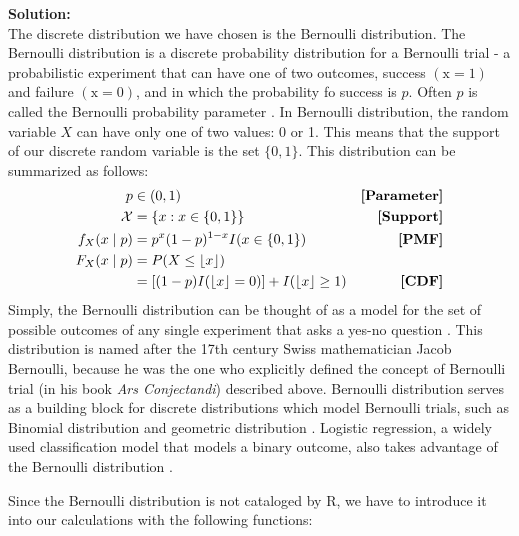 \documentclass{article}\usepackage[]{graphicx}\usepackage[]{color}
\begin{document}
\begin{enumerate}
\begin{enumerate}
\textbf{Solution:}\\ The discrete distribution we have chosen is the Bernoulli distribution. The Bernoulli distribution  is a discrete probability distribution for a Bernoulli trial - a probabilistic experiment that can have one of two outcomes, success $\mathrm{(x = 1)}$ and failure $\mathrm{(x = 0)}$, and in which the probability fo success is $p$. Often $p$  is called the Bernoulli probability parameter \citep{forbes_stat}. In Bernoulli distribution, the random variable $X$ can have only one of two values: 0 or 1. This means that the support of our discrete random variable is the set $\mathrm{\{0,1\}}$. This distribution can be summarized as follows:
\begin{align*}
  p               &\in (0,1)                                                                               &\text{\textbf{[Parameter]}}\\
  \mathcal{X}     & = \{x: x \in \{0,1\}\}                                                                   &\text{\textbf{[Support]}}\\
  f_{X}(x \mid p) & = p^{x} (1-p)^{1-x}I(x \in \{0,1\})                                                      &\text{\textbf{[PMF]}}\\
  F_{X}(x \mid p) & = P(X \leq \left\lfloor x \right\rfloor)\\
                  & = [(1-p)I(\left\lfloor x \right\rfloor = 0)] + I(\left\lfloor x \right\rfloor \geq 1)  &\text{\textbf{[CDF]}}\\
\end{align*}
Simply, the Bernoulli distribution can be thought of as a model for the set of possible outcomes of any single experiment that asks a yes-no question \citep{bernoulli_brilliant}. This distribution is named after the 17th century Swiss mathematician Jacob Bernoulli, because he was the one who explicitly defined the concept of Bernoulli trial (in his book \emph{Ars Conjectandi}) described above. Bernoulli distribution serves as a building block for discrete distributions which model Bernoulli trials, such as Binomial distribution and geometric distribution \citep{prob_world}. Logistic regression, a widely used classification model that models a binary outcome, also takes advantage of the Bernoulli distribution \citep{logistic_regression}.

Since the Bernoulli distribution is not cataloged by R, we have to introduce it into our calculations with the  following functions:


\end{enumerate}
\end{enumerate}
\end{document}
